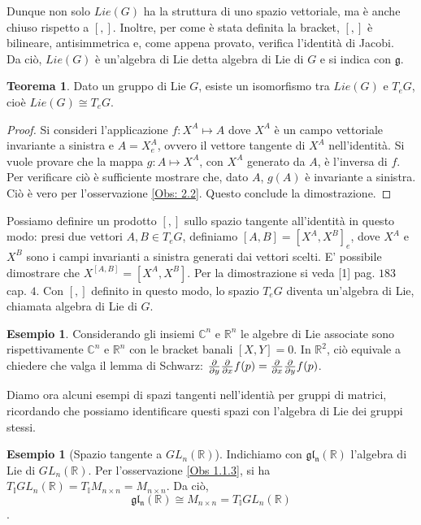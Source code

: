 \documentclass[12pt,a4paper]{report}
\theoremstyle{definition}
\theoremstyle{Theorem}
\newtheorem{Theo}[Def]{Teorema}
\theoremstyle{definition}
\newtheorem{Ex}[Def]{Esempio}
\theoremstyle{definition}
\theoremstyle{definition}
\begin{document}
Dunque non solo $Lie(G)$ ha la struttura di uno spazio vettoriale, ma è anche chiuso rispetto a $[,]$. Inoltre, per come è stata definita la bracket, $[,]$ è bilineare, antisimmetrica e, come appena provato, verifica l'identità di Jacobi.\\
Da ciò, $Lie(G)$ è un'algebra di Lie detta algebra di Lie di $G$ e si indica con $\mathfrak{g}$.
\begin{Theo}
	Dato un gruppo di Lie $G$, esiste un isomorfismo tra $Lie(G)$ e $T_eG$, cioè $Lie(G)\cong T_eG$.
\end{Theo}
\begin{proof}
	Si consideri l'applicazione $f:X^A\mapsto A$ dove $X^A$ è un campo vettoriale invariante a sinistra e $A=X^A_e$, ovvero il vettore tangente di $X^A$ nell'identità.
	Si vuole provare che la mappa $g:A\mapsto X^A$, con $X^A$ generato da $A$, è l'inversa di $f$. Per verificare ciò è sufficiente mostrare che, dato $A$, $g(A)$ è invariante a sinistra. Ciò è vero per l'osservazione \ref{Obs: 2.2}. Questo conclude la dimostrazione. 
\end{proof}
Possiamo definire un prodotto $[,]$ sullo spazio tangente all'identità in questo modo: presi due vettori $A,B\in T_eG$, definiamo $[A,B]=[X^A,X^B]_e$, dove $X^A$ e $X^B$ sono i campi invarianti a sinistra generati dai vettori scelti. E' possibile dimostrare che $X^{[A,B]}=[X^A,X^B]$. Per la dimostrazione si veda [1] pag. $183$ cap. $4$.
Con $[,]$ definito in questo modo, lo spazio $T_eG$ diventa un'algebra di Lie, chiamata algebra di Lie di $G$.
\begin{Ex}
	Considerando gli insiemi $\mathbb{C}^n$ e $\mathbb{R}^n$ le algebre di Lie associate sono rispettivamente $\mathbb{C}^n$ e $\mathbb{R}^n$ con le bracket banali $[X,Y]=0$. In $\mathbb{R}^2$, ciò equivale a chiedere che valga il lemma di Schwarz: ${\partial\over\partial y}{\partial\over\partial x}f(p)={\partial\over\partial x}{\partial\over\partial y}f(p)$.
\end{Ex}
Diamo ora alcuni esempi di spazi tangenti nell'identià per gruppi di matrici, ricordando che possiamo identificare questi spazi con l'algebra di Lie dei gruppi stessi.
\begin{Ex}[Spazio tangente a $GL_n(\mathbb{R})$]
	Indichiamo con $\mathfrak{gl_n(\mathbb{R})}$ l'algebra di Lie di $GL_n(\mathbb{R})$.
	Per l'osservazione \ref{Obs 1.1.3}, si ha $T_\mathbb{I}GL_n(\mathbb{R})=T_\mathbb{I}M_{n\times n}=M_{n\times n}$. Da ciò, $$\mathfrak{gl_n(\mathbb{R})}\cong M_{n\times n}= T_\mathbb{I}GL_n(\mathbb{R})$$.
\end{Ex}
\end{document}
